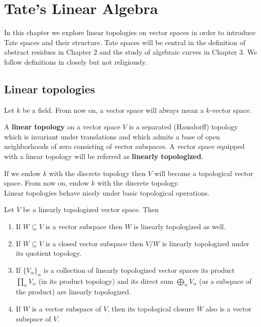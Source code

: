\chapter{Tate's Linear Algebra}\label{ch:tate-linear-algebra}
In this chapter we explore linear topologies on vector spaces in order to introduce Tate spaces and their structure. Tate spaces will be central in the definition of abstract residues in Chapter 2 and the study of algebraic curves in Chapter 3. We follow definitions in \cite{Chiral} closely but not religiously.
\section{Linear topologies}
Let $k$ be a field. From now on, a vector space will always mean a $k$-vector space.
\begin{definition}\label{def:linear_topology}
A \textbf{linear topology} on a vector space $V$ is a separated (Hausdorff) topology which is invariant under translations and which admits a base of open neighborhoods of zero consisting of vector subspaces. A vector space equipped with a linear topology will be referred as \textbf{linearly topologized}.
\end{definition}
If we endow $k$ with the discrete topology then $V$ will become a topological vector space. From now on, endow $k$ with the discrete topology. \\
Linear topologies behave nicely under basic topological operations.
\begin{theorem}\label{thm:linear_topologies_properties}
Let $V$ be a linearly topologized vector space. Then
	\begin{enumerate}[label = (\alph*)]
		\item If $W \subseteq V$ is a vector subspace then $W$ is linearly topologized as well.
		\item If $W \subseteq V$ is a closed vector subspace then $V/W$ is linearly topologized under its quotient topology.
		\item If $\{V_{\alpha}\}_{\alpha}$ is a collection of linearly topologized vector spaces its product $\prod_{\alpha} V_{\alpha}$ (in its product topology) and its direct sum $\bigoplus_{\alpha} V_{\alpha}$ (as a subspace of the product) are linearly topologized.
		\item If $W$ is a vector subspace of $V$, then its topological closure $\overline{W}$ also is a vector subspace of $V$.
	\end{enumerate}
\end{theorem}
